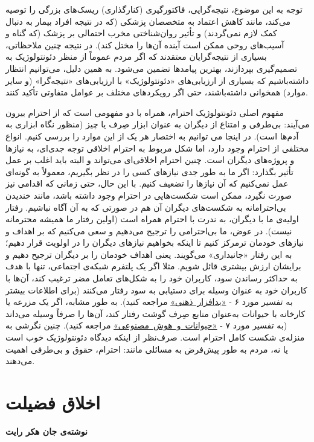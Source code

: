 توجه به این موضوع، نتیجه‌گرایی، فاکتورگیری (کنارگذاری) ریسک‌های بزرگی را توصیه می‌کند، مانند کاهش اعتماد به متخصصان پزشکی (که در نتیجه افراد بیمار به دنبال کمک لازم نمی‌گردند) و تأثیر روان‌شناختی مخرب احتمالی بر پزشک (که گناه و آسیب‌های روحی ممکن است آینده آن‌ها را مختل کند).
در نتیجه چنین ملاحظاتی، بسیاری از نتیجه‌گرایان معتقدند که اگر مردم عموماً از منظر دئونتولوژیک به تصمیم‌گیری بپردازند، بهترین پیامدها تضمین می‌شود.
به همین دلیل، می‌توانیم انتظار داشته‌باشیم که بسیاری از ارزیابی‌های «دئونتولوژیک» با ارزیابی‌های «نتیجه‌گرا» (و سایر موارد) همخوانی داشته‌باشند، حتی اگر رویکردهای مختلف بر عوامل متفاوتی تأکید کنند.

مفهوم اصلی دئونتولوژیک احترام، همراه با دو مفهومی است که از احترام بیرون می‌آیند: بی‌طرفی و امتناع از دیگران به عنوان ابزار صِرف یا چیز (منظور نگاه ابزاری به آدم‌ها است).
در اینجا می توانیم به اختصار هر یک از این موارد را بررسی کنیم.
انواع مختلفی از احترام وجود دارد، اما شکل مربوط به احترام اخلاقی توجه جدی‌ای، به نیازها و پروژه‌های دیگران است.
چنین احترام اخلاقی‌ای می‌تواند و البته باید اغلب بر عمل تأثیر بگذارد: اگر ما به طور جدی نیازهای کسی را در نظر بگیریم، معمولاً به گونه‌ای عمل نمی‌کنیم که آن نیازها را تضعیف کنیم.
با این حال، حتی زمانی که اقدامی نیز صورت نگیرد، ممکن است شکست‌هایی در احترام وجود داشته باشد، مانند خندیدن بی‌احترامانه به شکست‌های دیگران آن هم در صورتی که به آن آگاه نباشیم.
رفتار اولیه‌ی ما با دیگران، به ندرت با احترام همراه است (اولین رفتار ما همیشه محترمانه نیست).
در عوض، ما بی‌احترامی را ترجیح می‌دهیم و سعی می‌کنیم که بر اهداف و نیازهای خودمان ترمرکز کنیم تا اینکه بخواهیم نیازهای دیگران را در اولویت قرار دهیم؛ به این رفتار «جانبداری» می‌گویند.
یعنی اهداف خودمان را بر دیگران ترجیح دهیم و برایشان ارزش بیشتری قائل شویم.
مثلا اگر یک پلتفرم شبکه‌ی اجتماعی، تنها با هدف به حداکثر رساندن سود، کاربران خود را به شکل‌های تعامل مضر ترغیب کند، آن‌ها با کاربران خود به عنوان وسیله برای دستیابی به سود رفتار می‌کنند (برای اطلاعات بیشتر به تفسیر مورد ۶ - \hyperref[subsec:مورد۶ - بدافزار ذهنی: الگوریتم‌ها و معماری انتخاب]{\mbox{«بدافزار ذهنی»}} مراجعه کنید).
به طور مشابه، اگر یک مزرعه یا کارخانه با حیوانات به‌عنوان منابع صِرف گوشت رفتار کند، آن‌ها را صرفاً وسیله می‌داند (به تفسیر مورد ۷ - \hyperref[subsec:مورد۷ - هوش مصنوعی و موجودات غیر انسان]{\mbox{«حیوانات و هوش مصنوعی»}} مراجعه کنید).
چنین نگرشی به منزله‌ی شکست کامل احترام است.
صرف‌نظر از اینکه دیدگاه دئونتولوژیک خوب است یا نه، مردم به طور پیش‌فرض به مسائلی مانند: احترام، حقوق و بی‌طرفی اهمیت می‌دهند.


\section*{اخلاق فضیلت}
\label{sec:اخلاق فضیلت}
\textbf{نوشته‌ی جان هکر رایت}
